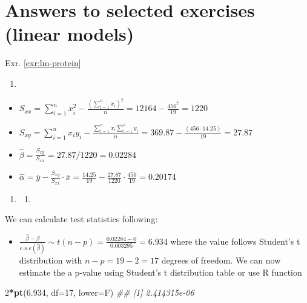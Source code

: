 \documentclass[
]{book}
\newenvironment{Shaded}{\begin{snugshade}}{\end{snugshade}}
\newcommand{\CommentTok}[1]{\textcolor[rgb]{0.56,0.35,0.01}{\textit{#1}}}
\newcommand{\DataTypeTok}[1]{\textcolor[rgb]{0.13,0.29,0.53}{#1}}
\newcommand{\DecValTok}[1]{\textcolor[rgb]{0.00,0.00,0.81}{#1}}
\newcommand{\FloatTok}[1]{\textcolor[rgb]{0.00,0.00,0.81}{#1}}
\newcommand{\KeywordTok}[1]{\textcolor[rgb]{0.13,0.29,0.53}{\textbf{#1}}}
\newcommand{\NormalTok}[1]{#1}
\newcommand{\OperatorTok}[1]{\textcolor[rgb]{0.81,0.36,0.00}{\textbf{#1}}}
\providecommand{\tightlist}{%
  \setlength{\itemsep}{0pt}\setlength{\parskip}{0pt}}
\theoremstyle{definition}
\theoremstyle{definition}
\theoremstyle{definition}
\theoremstyle{remark}
\begin{document}
\hypertarget{answers-to-selected-exercises-linear-models}{%
\section*{Answers to selected exercises (linear models)}\label{answers-to-selected-exercises-linear-models}}

Exr. \ref{exr:lm-protein}

\begin{enumerate}
\def\labelenumi{\alph{enumi})}
\tightlist
\item
\end{enumerate}

\begin{itemize}
\tightlist
\item
  \(S_{xx} = \sum_{i=1}^{n}x_i^2-\frac{(\sum_{i=1}^{n}x_i)^2}{n} = 12164 - \frac{456^2}{19} = 1220\)
\item
  \(S_{xy} = \sum_{i=1}^nx_iy_i-\frac{\sum_{i=1}^{n}x_i\sum_{i=1}^{n}y_i}{n} = 369.87 - \frac{(456 \cdot 14.25)}{19} = 27.87\)
\item
  \(\hat{\beta} = \frac{S_{xy}}{S_{xx}} = 27.87 / 1220 = 0.02284\)
\item
  \(\hat{\alpha} = \bar{y}-\frac{S_{xy}}{S_{xx}}\cdot \bar{x} = \frac{14.25}{19}-\frac{27.87}{1220}\cdot \frac{456}{19} = 0.20174\)
\end{itemize}

\begin{enumerate}
\def\labelenumi{\alph{enumi})}
\setcounter{enumi}{1}
\item
  \begin{enumerate}
  \def\labelenumii{\roman{enumii}.}
  \tightlist
  \item
  \end{enumerate}
\end{enumerate}

We can calculate test statistics following:

\begin{itemize}
\tightlist
\item
  \(\frac{\hat{\beta} - \beta}{e.s.e(\hat{\beta})} \sim t(n-p) = \frac{0.02284 - 0}{0.003295} = 6.934\) where the value follows Student's t distribution with \(n-p = 19 - 2 = 17\) degrees of freedom. We can now estimate the a p-value using Student's t distribution table or use R function
\end{itemize}

\begin{Shaded}
\begin{Highlighting}[]
\DecValTok{2}\OperatorTok{*}\KeywordTok{pt}\NormalTok{(}\FloatTok{6.934}\NormalTok{, }\DataTypeTok{df=}\DecValTok{17}\NormalTok{, }\DataTypeTok{lower=}\NormalTok{F)}
\CommentTok{\#\# [1] 2.414315e{-}06}
\end{Highlighting}
\end{Shaded}
\end{document}
